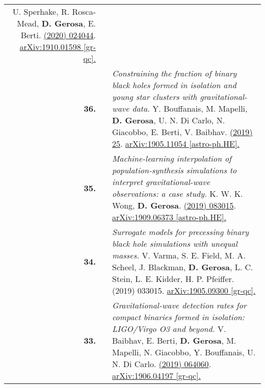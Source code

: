 {\begin{longtable}{rp{0.3cm}p{15.8cm}}
U. Sperhake, R. Rosca-Mead, \textbf{D. Gerosa}, E. Berti.
\newline{}
\href{https://journals.aps.org/prd/abstract/10.1103/PhysRevD.101.024044}{\prd 101 (2020) 024044}. \href{https://arxiv.org/abs/1910.01598}{arXiv:1910.01598 [gr-qc].}
\vspace{0.09cm}\\
%
\textbf{36.} & & \textit{Constraining the fraction of binary black holes formed in isolation and young star clusters with gravitational-wave data.}
\newline{}
Y. Bouffanais, M. Mapelli, \textbf{D. Gerosa}, U. N. Di Carlo, N. Giacobbo, E. Berti, V. Baibhav.
\newline{}
\href{https://iopscience.iop.org/article/10.3847/1538-4357/ab4a79}{\apj 886 (2019) 25}. \href{https://arxiv.org/abs/1905.11054}{arXiv:1905.11054 [astro-ph.HE].}
\vspace{0.09cm}\\
%
\textbf{35.} & & \textit{Machine-learning interpolation of population-synthesis simulations to interpret gravitational-wave observations: a case study.}
\newline{}
K. W. K. Wong, \textbf{D. Gerosa}.
\newline{}
\href{https://journals.aps.org/prd/abstract/10.1103/PhysRevD.100.083015}{\prd 100 (2019) 083015}. \href{https://arxiv.org/abs/1909.06373}{arXiv:1909.06373 [astro-ph.HE].}
\vspace{0.09cm}\\
%
\textbf{34.} & & \textit{Surrogate models for precessing binary black hole simulations with unequal masses.}
\newline{}
V. Varma, S. E. Field, M. A. Scheel, J. Blackman, \textbf{D. Gerosa}, L. C. Stein, L. E. Kidder, H. P. Pfeiffer.
\newline{}
{\prr 1 (2019) 033015}. \href{https://arxiv.org/abs/1905.09300}{arXiv:1905.09300 [gr-qc].}
\vspace{0.09cm}\\
%
\textbf{33.} & & \textit{Gravitational-wave detection rates for compact binaries formed in isolation: LIGO/Virgo O3 and beyond.}
\newline{}
V. Baibhav, E. Berti, \textbf{D. Gerosa}, M. Mapelli, N. Giacobbo, Y. Bouffanais, U. N. Di Carlo.
\newline{}
\href{https://journals.aps.org/prd/abstract/10.1103/PhysRevD.100.064060}{\prd 100 (2019) 064060}. \href{https://arxiv.org/abs/1906.04197}{arXiv:1906.04197 [gr-qc].}
\vspace{0.09cm}\\

\end{longtable}}
